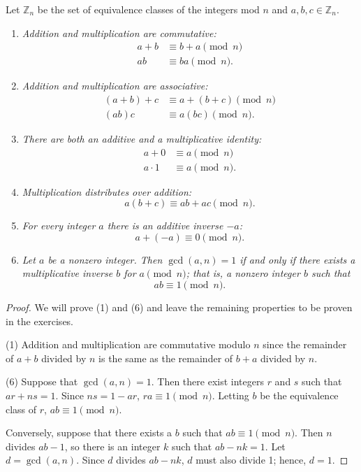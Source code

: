 \begin{proposition}\label{Zn_equiv_classes}
Let ${\mathbb Z}_n$ be the set of equivalence classes of the integers mod $n$ and $a, b, c \in {\mathbb Z}_n$.
\begin{enumerate}
 
\rm \item \it %
Addition and multiplication are commutative:
\begin{align*}
a + b  & \equiv  b + a \pmod{ n} \\
a  b   & \equiv  b  a \pmod{ n}.
\end{align*}
 
\rm \item \it %
Addition and multiplication are associative:
\begin{align*}
(a + b) + c  & \equiv  a + (b + c) \pmod{ n} \\
(a  b)  c    & \equiv  a   (b  c)
\pmod{ n}.
\end{align*}
 
\rm \item \it %
There are both an additive and a multiplicative identity:
\begin{align*}
a + 0  & \equiv  a \pmod{ n} \\
a \cdot  1  & \equiv  a \pmod{ n}.
\end{align*} 
 
\rm \item \it %
Multiplication distributes over addition:
\[
a  (b  + c)  \equiv a  b + a  c  \pmod{ n}.
\]
 
\rm \item \it %
For every integer $a$ there is an additive inverse $-a$:
\[
a + (-a)  \equiv 0 \pmod{ n}.
\]
 
\rm \item \it %
Let $a$ be a nonzero integer.  Then $\gcd(a,n) = 1$ if and only if there exists a multiplicative inverse $b$ for $a \pmod{n}$; that is, a nonzero integer $b$ such that
\[
a  b  \equiv 1 \pmod{ n}.
\]
 
\end{enumerate}
\end{proposition}
 
\begin{proof}
We will prove (1) and (6) and leave the remaining properties to be proven in the exercises. 

(1)
Addition and multiplication are commutative modulo $n$ since the remainder of $a + b$ divided by $n$ is the same as the remainder of $b + a$ divided by $n$. 
 
(6)
Suppose that $\gcd(a, n) = 1$.  Then there exist integers $r$ and $s$ such that $ar + ns = 1$.  Since $ns = 1 - ar$, $ra  \equiv 1 \pmod{n}$.  Letting $b$ be the equivalence class of $r$, $a b \equiv 1\pmod{n}$. 
 
Conversely, suppose that there exists a $b$ such that $ab  \equiv 1 \pmod{ n}$.  Then $n$ divides $ab -1$, so there is an integer $k$ such that $ab - nk = 1$.  Let $d = \gcd(a,n)$.  Since $d$ divides $ab - nk$, $d$ must also divide 1; hence, $d = 1$.
\mbox{\hspace*{1in}}
\end{proof}
 
